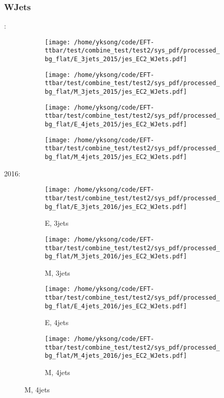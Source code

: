 \documentclass{beamer}
\begin{document}
\begin{frame}
\frametitle{WJets}
\fontsize{5}{1}:
\begin{figure}
\centering
\begin{subfigure}[b]{0.24\textwidth}
\texttt{[image: /home/yksong/code/EFT-ttbar/test/combine\_test/test2/sys\_pdf/processed\_bg\_flat/E\_3jets\_2015/jes\_EC2\_WJets.pdf]}
\end{subfigure}
\begin{subfigure}[b]{0.24\textwidth}
\texttt{[image: /home/yksong/code/EFT-ttbar/test/combine\_test/test2/sys\_pdf/processed\_bg\_flat/M\_3jets\_2015/jes\_EC2\_WJets.pdf]}
\end{subfigure}
\begin{subfigure}[b]{0.24\textwidth}
\texttt{[image: /home/yksong/code/EFT-ttbar/test/combine\_test/test2/sys\_pdf/processed\_bg\_flat/E\_4jets\_2015/jes\_EC2\_WJets.pdf]}
\end{subfigure}
\begin{subfigure}[b]{0.24\textwidth}
\texttt{[image: /home/yksong/code/EFT-ttbar/test/combine\_test/test2/sys\_pdf/processed\_bg\_flat/M\_4jets\_2015/jes\_EC2\_WJets.pdf]}
\end{subfigure}
\end{figure}
2016:
\begin{figure}
\centering
\begin{subfigure}[b]{0.24\textwidth}
\texttt{[image: /home/yksong/code/EFT-ttbar/test/combine\_test/test2/sys\_pdf/processed\_bg\_flat/E\_3jets\_2016/jes\_EC2\_WJets.pdf]}
\captionsetup{font=tiny}
\caption{E, 3jets}
\end{subfigure}
\begin{subfigure}[b]{0.24\textwidth}
\texttt{[image: /home/yksong/code/EFT-ttbar/test/combine\_test/test2/sys\_pdf/processed\_bg\_flat/M\_3jets\_2016/jes\_EC2\_WJets.pdf]}
\captionsetup{font=tiny}
\caption{M, 3jets}
\end{subfigure}
\begin{subfigure}[b]{0.24\textwidth}
\texttt{[image: /home/yksong/code/EFT-ttbar/test/combine\_test/test2/sys\_pdf/processed\_bg\_flat/E\_4jets\_2016/jes\_EC2\_WJets.pdf]}
\captionsetup{font=tiny}
\caption{E, 4jets}
\end{subfigure}
\begin{subfigure}[b]{0.24\textwidth}
\texttt{[image: /home/yksong/code/EFT-ttbar/test/combine\_test/test2/sys\_pdf/processed\_bg\_flat/M\_4jets\_2016/jes\_EC2\_WJets.pdf]}
\captionsetup{font=tiny}
\caption{M, 4jets}
\end{subfigure}
\end{figure}
\end{frame}
\end{document}
